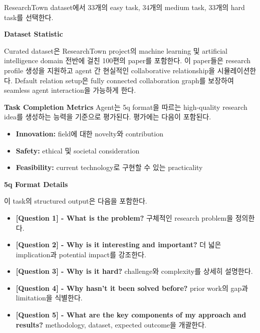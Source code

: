 ResearchTown dataset에서 33개의 easy task, 34개의 medium task, 33개의 hard task를 선택한다.

\textbf{Dataset Statistic}

Curated dataset은 ResearchTown\citep{yu2024researchtownsimulatorhumanresearch} project의 machine learning 및 artificial intelligence domain 전반에 걸친 100편의 paper를 포함한다. 이 paper들은 research profile 생성을 지원하고 agent 간 현실적인 collaborative relationship을 시뮬레이션한다. Default relation setup은 fully connected collaboration graph를 보장하여 seamless agent interaction을 가능하게 한다.

\textbf{Task Completion Metrics}
\label{research_task_metric}
Agent는 5q format을 따르는 high-quality research idea를 생성하는 능력을 기준으로 평가된다. 평가에는 다음이 포함된다.
\begin{itemize}
    \item \textbf{Innovation:} field에 대한 novelty와 contribution
    \item \textbf{Safety:} ethical 및 societal consideration
    \item \textbf{Feasibility:} current technology로 구현할 수 있는 practicality
\end{itemize}

\textbf{5q Format Details}

이 task의 structured output은 다음을 포함한다.
\begin{itemize}
    \item \textbf{[Question 1] - What is the problem?} 구체적인 research problem을 정의한다.
    \item \textbf{[Question 2] - Why is it interesting and important?} 더 넓은 implication과 potential impact를 강조한다.
    \item \textbf{[Question 3] - Why is it hard?} challenge와 complexity를 상세히 설명한다.
    \item \textbf{[Question 4] - Why hasn't it been solved before?} prior work의 gap과 limitation을 식별한다.
    \item \textbf{[Question 5] - What are the key components of my approach and results?} methodology, dataset, expected outcome을 개괄한다.
\end{itemize}


